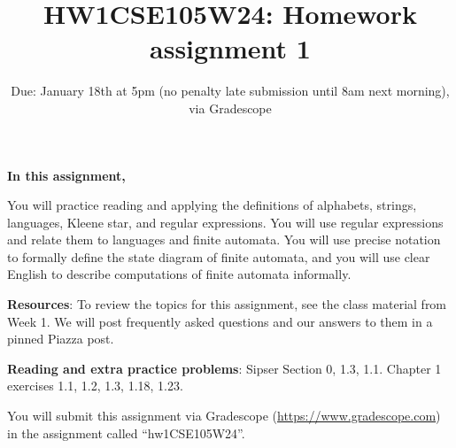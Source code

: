 

\title{HW1CSE105W24: Homework assignment 1}
\date{Due: January 18th at 5pm (no penalty late submission until 8am next morning), via Gradescope}



\maketitle
\thispagestyle{fancy}

{\bf In this assignment,}

You will practice reading and
applying the definitions of alphabets, strings, languages, Kleene star, and regular expressions.
You will use regular expressions and relate them to languages and finite automata.
You will use precise notation to formally define the state diagram of finite automata,
and you will use clear English to describe computations of finite automata informally.


{\bf Resources}: To review the topics 
for this assignment, see the class material from Week 1.
We will post frequently asked questions and our answers to them in a 
pinned Piazza post.

{\bf Reading and extra practice problems}: Sipser Section 0, 1.3, 1.1.
Chapter 1 exercises 1.1, 1.2, 1.3, 1.18, 1.23.

\instructions

You will submit this assignment via Gradescope
(\href{https://www.gradescope.com}{https://www.gradescope.com}) 
in the assignment called ``hw1CSE105W24''.

